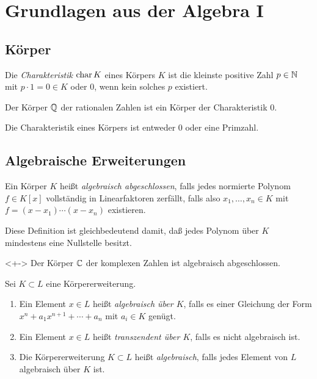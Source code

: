 \section{Grundlagen aus der Algebra I}


\subsection{Körper}

\begin{definition}
	Die \emph{Charakteristik \(\operatorname{char} K\)} eines Körpers \(K\) ist die
	kleinste positive Zahl \(p \in \mathbb N\) mit \(p \cdot 1 = 0 \in K\) oder
	\(0\), wenn kein solches \(p\) existiert.
\end{definition}

\begin{example}
	Der Körper \(\mathbb Q\) der rationalen Zahlen ist ein Körper der
	Charakteristik \(0\).
\end{example}

\begin{proposition}
	Die Charakteristik eines Körpers ist entweder \(0\) oder eine Primzahl.
\end{proposition}

\subsection{Algebraische Erweiterungen}

\begin{definition}
	Ein Körper \(K\) heißt \emph{algebraisch abgeschlossen}, falls
	jedes normierte Polynom \(f \in K[x]\) vollständig in Linearfaktoren zerfällt,
	falls also \(x_1, \dotsc, x_n \in K\) mit \(f = (x - x_1) \dotsm (x - x_n)\) existieren.
\end{definition}

Diese Definition ist gleichbedeutend damit, daß jedes Polynom über \(K\) mindestens eine Nullstelle besitzt.

\begin{example}<+->
	Der Körper \(\mathbb C\) der komplexen Zahlen ist algebraisch abgeschlossen.
\end{example}

\begin{definition}
	Sei \(K \subset L\) eine Körpererweiterung.
	\begin{enumerate}
	\item
		Ein Element \(x \in L\) heißt \emph{algebraisch über \(K\)}, falls es
		einer Gleichung der Form \(x^n + a_1 x^{n + 1} + \dotsb + a_n\) mit \(a_i \in K\)
		genügt.
	\item
		Ein Element \(x \in L\) heißt \emph{transzendent über \(K\)}, falls es
		nicht algebraisch ist.
	\item
		Die Körpererweiterung \(K \subset L\) heißt \emph{algebraisch}, falls jedes
		Element von \(L\) algebraisch über \(K\) ist.
	\end{enumerate}
\end{definition}

